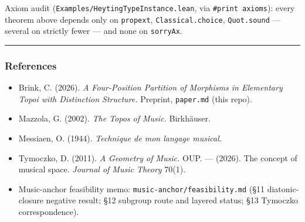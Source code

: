 \documentclass[
  11pt,
]{article}
\newcounter{none} %
\providecommand{\tightlist}{%
  \setlength{\itemsep}{0pt}\setlength{\parskip}{0pt}}
\begin{document}
Axiom audit (\texttt{Examples/HeytingTypeInstance.lean}, via
\texttt{\#print\ axioms}): every theorem above depends only on
\texttt{propext}, \texttt{Classical.choice}, \texttt{Quot.sound} ---
several on strictly fewer --- and none on \texttt{sorryAx}.

\begin{center}\rule{0.5\linewidth}{0.5pt}\end{center}

\subsubsection{References}\label{references}

\begin{itemize}
\tightlist
\item
  Brink, C. (2026). \emph{A Four-Position Partition of Morphisms in
  Elementary Topoi with Distinction Structure.} Preprint,
  \texttt{paper.md} (this repo).
\item
  Mazzola, G. (2002). \emph{The Topos of Music.} Birkhäuser.
\item
  Messiaen, O. (1944). \emph{Technique de mon langage musical.}
\item
  Tymoczko, D. (2011). \emph{A Geometry of Music.} OUP. --- (2026). The
  concept of musical space. \emph{Journal of Music Theory} 70(1).
\item
  Music-anchor feasibility memo: \texttt{music-anchor/feasibility.md}
  (§11 diatonic-closure negative result; §12 subgroup route and layered
  status; §13 Tymoczko correspondence).
\end{itemize}
\end{document}
